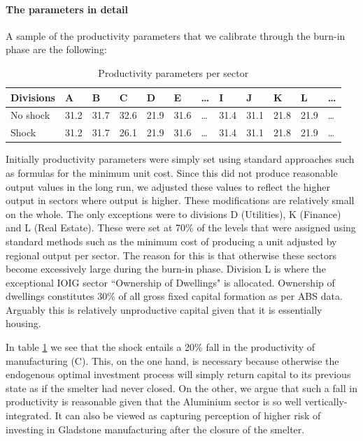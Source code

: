 \documentclass[12pt,a4paper]{article}
\begin{document}
\paragraph{The parameters in detail} A sample of the productivity parameters
that we calibrate through the burn-in phase are the following:

\begin{table}[H]
\centering
  \caption{\label{tab-prod} Productivity parameters per sector}
\begin{tabular}{l|l|l|l|l|l|l|l|l|l|l|l}

  Divisions &  A  & B  & C  & D  & E  & \dots  & I  & J  & K  & L & \dots \\

\hline

  No shock & 31.2 & 31.7 & 32.6 & 21.9 & 31.6 & \dots & 31.4 & 31.1 & 21.8 &
  21.9 & \dots\\

\hline

  Shock & 31.2 & 31.7 & {\color{red}26.1} & 21.9 & 31.6 & \dots & 31.4 & 31.1 &
  21.8 & 21.9 & \dots\\

\end{tabular}
\end{table}
 
Initially productivity parameters were simply set using standard approaches
such as formulas for the minimum unit cost. Since this did not produce
reasonable output values in the long run, we adjusted these values to reflect
the higher output in sectors where output is higher.  These modifications are
relatively small on the whole.  The only exceptions were to divisions D
(Utilities), K (Finance) and L (Real Estate). These were set at 70\% of the
levels that were assigned using standard methods such as the minimum cost of
producing a unit adjusted by regional output per sector.  The reason for this
is that otherwise these sectors become excessively large during the burn-in
phase. Division L is where the exceptional IOIG sector ``Ownership of
Dwellings" is allocated. Ownership of dwellings constitutes 30\% of all gross
fixed capital formation as per ABS data. Arguably this is relatively
unproductive capital given that it is essentially housing.


In table \ref{tab-prod} we see that the shock entails a 20\% fall in the
productivity of manufacturing (C). This, on the one hand, is necessary because
otherwise the endogenous optimal investment process will simply return capital
to its previous state as if the smelter had never closed. On the other, we
argue that such a fall in productivity is reasonable given that the Aluminium
sector is so well vertically-integrated.  It can also be viewed as capturing
perception of higher risk of investing in Gladstone manufacturing after the
closure of the smelter.
\end{document}
